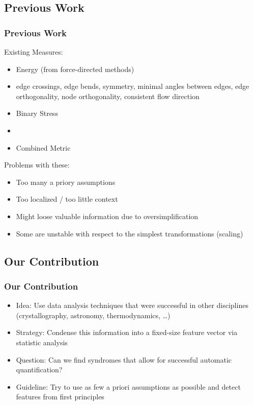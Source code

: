 \documentclass{beamer}
\begin{document}
\subsection{Previous Work}
\begin{frame}
  \frametitle{Previous Work}
  Existing Measures:
  \par\smallskip
  \begin{itemize}
  \item Energy (from force-directed methods)
  \item\textcite{Purchase2002}\newline
    \begingroup\footnotesize
    edge crossings, edge bends, symmetry, minimal angles between edges, edge orthogonality, node orthogonality,
    consistent flow direction
    \endgroup
  \item Binary Stress \parencite{Kamada1989,Koren2008}
  \item\textcite{Klapaukh2014}
  \item Combined Metric \parencite{Huang2016}
  \end{itemize}
  \par\bigskip
  Problems with these:
  \par\smallskip
  \begin{itemize}
  \item Too many a priory assumptions
  \item Too localized / too little context
  \item Might loose valuable information due to oversimplification
  \item Some are unstable with respect to the simplest transformations (scaling)
  \end{itemize}
\end{frame}

\subsection{Our Contribution}
\begin{frame}
  \frametitle{Our Contribution}
  \begin{itemize}
  \item Idea: Use data analysis techniques that were successful in other disciplines (crystallography, astronomy,
    thermodynamics, \dots)
  \item Strategy: Condense this information into a fixed-size feature vector via statistic analysis
  \item Question: Can we find syndromes that allow for successful automatic quantification?
  \item Guideline: Try to use as few a priori assumptions as possible and detect features from first principles
  \end{itemize}
\end{frame}
\end{document}
